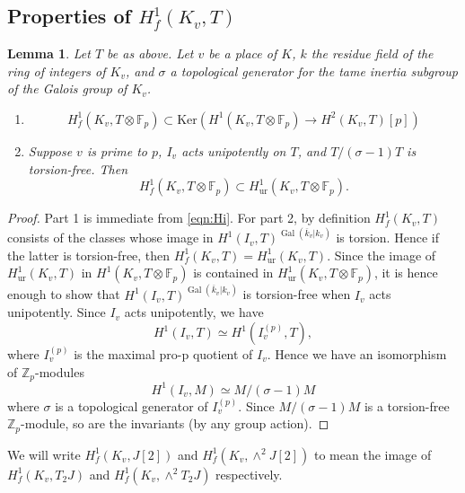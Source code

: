 \documentclass[11pt]{amsart}
\def\Z{\mathbb Z}
\def\F{\mathbb F}
\theoremstyle{plain}
\newtheorem{lemma}{Lemma}
\theoremstyle{definition}
\DeclareMathOperator{\Gal}{Gal}
\newcommand{\ur}{\mathrm{ur}}
\newcommand{\Ker}{\mathrm{Ker}}
\begin{document}
\subsection{Properties of $H^1 _f (K_v ,T)$}
\begin{lemma}\label{lemma:unipotent_implies_same}
Let $T$ be as above. Let $v$ be a place of $K$, $k$ the residue field of the ring of integers of $K_v$, and $\sigma $ a topological generator for the tame inertia subgroup of the Galois group of $K_v$.
\begin{enumerate}
\item 
\begin{equation}
H^1 _f (K_v ,T\otimes \F_p )\subset \Ker (H^1 (K_v ,T\otimes \F _p )\to H^2 (K_v ,T)[p])
\end{equation}
\item Suppose $v$ is prime to $p$, $I_v $ acts unipotently on $T$, and $T/(\sigma -1)T$ is torsion-free. Then
\[
H^1 _f (K_v ,T\otimes \F_p ) \subset H^1 _{\ur}(K_v ,T\otimes \F _p ).
\]
\end{enumerate}
\end{lemma}
\begin{proof}
Part 1 is immediate from \eqref{eqn:Hi}. For part 2, by definition $H^1 _f (K_v ,T)$ consists of the classes whose image in $H^1 (I_v ,T)^{\Gal(\overline{k}_v |k_v )}$ is torsion. Hence if the latter is torsion-free, then $H^1 _f (K_v ,T)=H^1 _{\ur }(K_v ,T)$. Since the image of $H^1 _{\ur }(K_v ,T)$ in $H^1 (K_v ,T\otimes \F _p )$ is contained in $H^1 _{\ur}(K_v ,T\otimes \F _p )$, it is hence enough to show that $H^1 (I_v ,T)^{\Gal(\overline{k}_v |k_v )}$ is torsion-free when $I_v $ acts unipotently. Since $I_v$ acts unipotently, we have
\[
H^1 (I_v ,T)\simeq H^1 (I_v ^{(p)},T),
\]
where $I_v ^{(p)}$ is the maximal pro-p quotient of $I_v$. Hence we have an isomorphism of $\Z _p $-modules
\[
H^1 (I_v ,M)\simeq M/(\sigma -1)M
\]
where $\sigma $ is a topological generator of $I_v ^{(p)}$. Since $M/(\sigma -1)M$ is a torsion-free $\mathbb{Z}_p $-module, so are the invariants (by any group action).
\end{proof}

We will write $H^1 _f (K_v ,J[2])$ and $H^1 _f (K_v ,\wedge ^2 J[2])$ to mean the image of $H^1 _f (K_v ,T_2 J)$ and $H^1 _f (K_v ,\wedge ^2 T_2 J)$ respectively.
\end{document}
